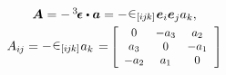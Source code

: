 \nopagebreak\vspace{-0.1em}\begin{equation*}
\begin{array}{c}
\bm{A} = - \, \permutationsparitytensor \dotp \bm{a} = - \hspace{.1ex} \permutationsparitysymbols{i\hspace{-0.1ex}j\hspace{-0.1ex}k} \hspace{.1ex} \bm{e}_i \bm{e}_j a_k ,
\\[.3em]
A_{i\hspace{-0.1ex}j} = - \hspace{.1ex} \permutationsparitysymbols{i\hspace{-0.1ex}j\hspace{-0.1ex}k} \hspace{.1ex} a_k \hspace{.1em} = \hspace{-0.1em}
\scalebox{0.9}[0.9]{$\left[ \begin{array}{ccc}
0 & -a_3 & a_2 \\
a_3 & 0 & -a_1 \\
-a_2 & a_1 & 0
\end{array} \hspace{.25ex}\right]$}
\end{array}
\end{equation*}

\vspace{-0.4em}
\noindent
{}

